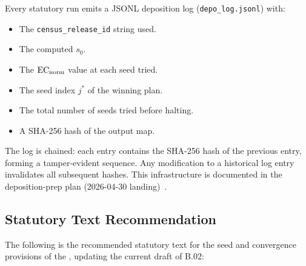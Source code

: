Every statutory \cs{} run emits a JSONL deposition log
(\texttt{depo\_log.jsonl}) with:
\begin{itemize}
\item The \texttt{census\_release\_id} string used.
\item The computed $s_0$.
\item The $\mathrm{EC}_{\mathrm{norm}}$ value at each seed tried.
\item The seed index $j^*$ of the winning plan.
\item The total number of seeds tried before halting.
\item A SHA-256 hash of the output map.
\end{itemize}

The log is chained: each entry contains the SHA-256 hash of the previous
entry, forming a tamper-evident sequence.
Any modification to a historical log entry invalidates all subsequent hashes.
This infrastructure is documented in the deposition-prep plan
(2026-04-30 landing)~\citep{depoplan}.

\subsection{Statutory Text Recommendation}

The following is the recommended statutory text for the seed and convergence
provisions of the \dia{}, updating the current draft of B.02:

